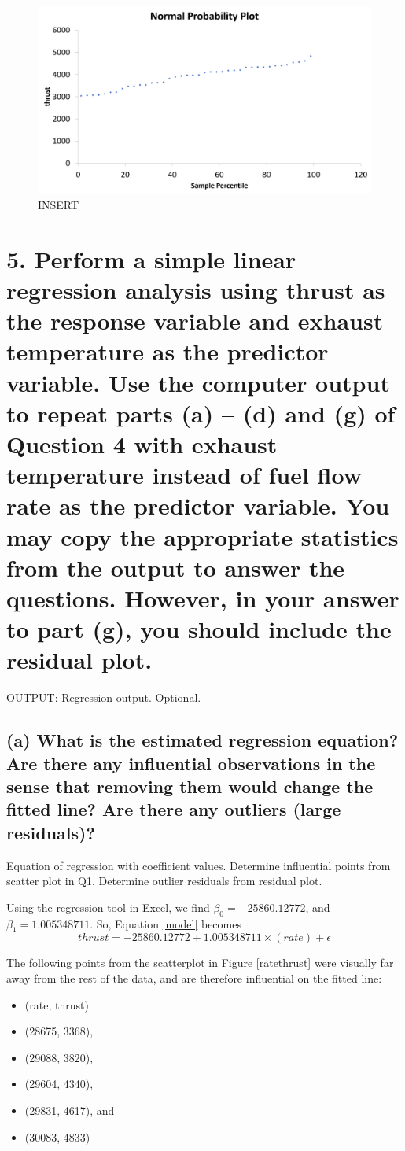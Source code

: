\documentclass[letterpaper]{article}
\begin{document}
\begin{figure}[H]
 \centering
 \includegraphics[width=\textwidth]{normalplot.png}
 \caption{INSERT}
\end{figure}

\section{5.	Perform a simple linear regression analysis using thrust as the response variable and exhaust temperature as the predictor variable. Use the computer output to repeat parts (a) – (d) and (g) of Question 4 with exhaust temperature instead of fuel flow rate as the predictor variable. You may copy the appropriate statistics from the output to answer the questions. However, in your answer to part (g), you should include the residual plot.}
OUTPUT: Regression output. Optional.

\subsection{(a)	What is the estimated regression equation? Are there any influential observations  in the sense that removing them would change the fitted line? Are there any outliers (large residuals)?}
Equation of regression with coefficient values. Determine
influential points from scatter plot in Q1. Determine outlier residuals from residual plot.

Using the regression tool in Excel, we find $\beta_0=-25860.12772$, and
$\beta_1=1.005348711$.
So, Equation \ref{model} becomes
$$ thrust = -25860.12772 + 1.005348711 \times (rate) + \epsilon$$

The following points from the scatterplot in Figure \ref{ratethrust} were visually far
away from the rest of the data, and are therefore influential on the fitted line:
\begin{itemize}
 \item[] (rate, thrust)
 \item[] (28675, 3368),
 \item[] (29088, 3820),
 \item[] (29604, 4340),
 \item[] (29831, 4617), and
 \item[] (30083, 4833)
\end{itemize}
\end{document}
